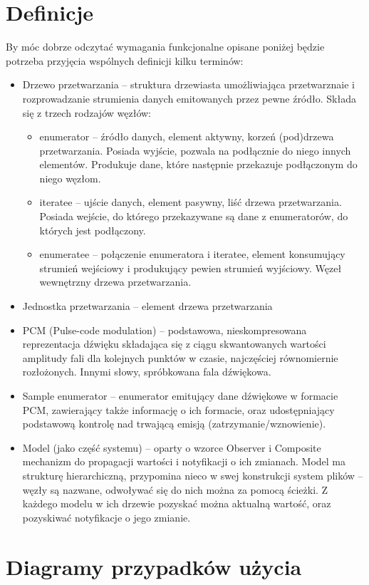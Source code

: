 \section{Definicje}
By móc dobrze odczytać wymagania funkcjonalne opisane poniżej będzie potrzeba przyjęcia wspólnych definicji kilku terminów:
\begin{itemize}
\item Drzewo przetwarzania – struktura drzewiasta umożliwiająca przetwarznaie i rozprowadzanie strumienia danych emitowanych przez pewne źródło. Składa się z trzech rodzajów węzłów:
\begin{itemize}
\item enumerator – źródło danych, element aktywny, korzeń (pod)drzewa przetwarzania. Posiada wyjście, pozwala na podłącznie do niego innych elementów. Produkuje dane, które następnie przekazuje podłączonym do niego węzłom.
\item iteratee – ujście danych, element pasywny, liść drzewa przetwarzania. Posiada wejście, do którego przekazywane są dane z enumeratorów, do których jest podłączony.
\item enumeratee – połączenie enumeratora i iteratee, element konsumujący strumień wejściowy i produkujący pewien strumień wyjściowy. Węzeł wewnętrzny drzewa przetwarzania.
\end{itemize}
\item Jednostka przetwarzania – element drzewa przetwarzania
\item PCM (Pulse-code modulation) – podstawowa, nieskompresowana reprezentacja dźwięku składająca się z ciągu skwantowanych wartości amplitudy fali dla kolejnych punktów w czasie, najczęściej równomiernie rozłożonych. Innymi słowy, spróbkowana fala dźwiękowa.
\item Sample enumerator – enumerator emitujący dane dźwiękowe w formacie PCM, zawierający także informację o ich formacie, oraz udostępniający podstawową kontrolę nad trwającą emisją (zatrzymanie/wznowienie).
\item Model (jako część systemu) – oparty o wzorce Observer i Composite mechanizm do propagacji wartości i notyfikacji o ich zmianach. Model ma strukturę hierarchiczną, przypomina nieco w swej konstrukcji system plików – węzły są nazwane, odwoływać się do nich można za pomocą ścieżki. Z każdego modelu w ich drzewie pozyskać można aktualną wartość, oraz pozyskiwać notyfikacje o jego zmianie.
\end{itemize}

\section{Diagramy przypadków użycia}
